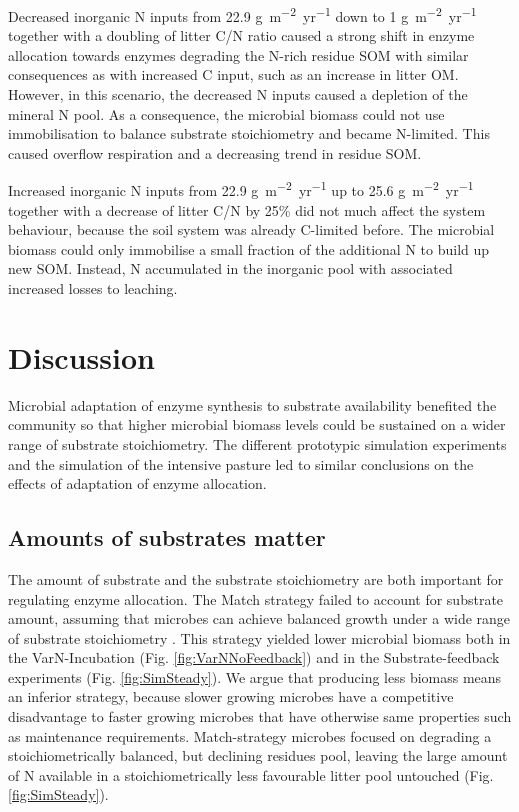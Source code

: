 Decreased inorganic N inputs from 22.9
\unit{g~m^{-2}yr^{-1}} down to 1
\unit{g~m^{-2}yr^{-1}} together with a doubling of litter C/N
ratio caused a strong shift in enzyme allocation towards enzymes degrading the
N-rich residue SOM with similar consequences as with increased C input,
such as an increase in litter OM. However, in this scenario, the decreased N inputs caused
a depletion of the mineral N pool.
As a consequence, the microbial biomass could not use immobilisation to
balance substrate stoichiometry and became N-limited.
This caused overflow respiration and a decreasing trend in residue SOM. 

Increased inorganic N inputs from 22.9 \unit{g~m^{-2}yr^{-1}} up to 25.6
\unit{g~m^{-2}yr^{-1}} together with a decrease of litter C/N by 25\% did not
much affect the system behaviour, because the soil system was already C-limited
before. The microbial biomass could only immobilise a small fraction of
the additional N to build up new SOM. Instead, N accumulated in the inorganic
pool with associated increased losses to leaching.


\section{Discussion}
Microbial adaptation of enzyme synthesis to substrate availability benefited the
community so that higher microbial biomass levels could be sustained on a wider
range of substrate stoichiometry.
The different prototypic simulation experiments and the simulation of the
intensive pasture led to similar conclusions on the effects of adaptation of
enzyme allocation.

\subsection{Amounts of substrates matter}
The amount of substrate and the substrate stoichiometry are both important for
regulating enzyme allocation. The Match strategy failed to account for substrate
amount, assuming that microbes can achieve balanced growth under a wide range of
substrate stoichiometry \citep{Moorhead12, Ballantyne14}. This strategy yielded
lower microbial biomass both in the VarN-Incubation (Fig.
\ref{fig:VarNNoFeedback}) and in the Substrate-feedback experiments (Fig.
\ref{fig:SimSteady}). We argue that producing less biomass means an inferior
strategy, because slower growing microbes have a competitive disadvantage to
faster growing microbes that have otherwise same properties such as
maintenance requirements. Match-strategy microbes focused on degrading a
stoichiometrically balanced, but declining residues pool, leaving the large
amount of N available in a stoichiometrically less favourable litter pool
untouched (Fig. \ref{fig:SimSteady}).

